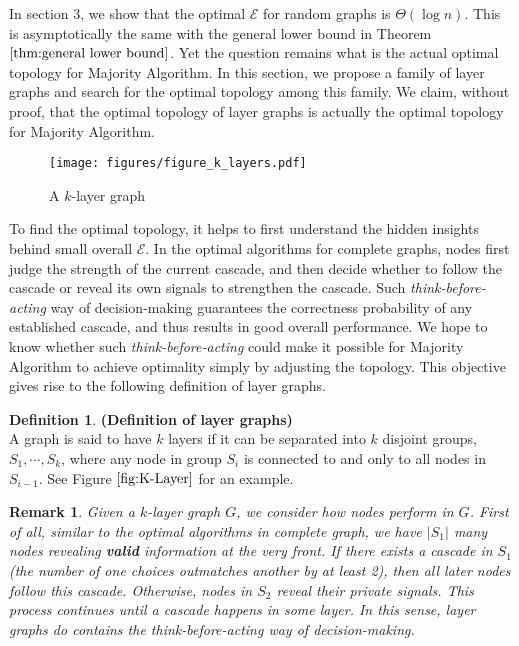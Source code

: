 \documentclass[a4paper,UKenglish]{lipics}
\newtheorem{rmk}{Remark}
\theoremstyle{definition}
\newtheorem{defn}[thm]{Definition}
\begin{document}
In section 3, we show that the optimal $\mathcal{E}$ for random graphs is $\Theta(\log n)$.
This is asymptotically the same with the general lower bound in Theorem $\ref{thm:general lower bound}$.
Yet the question remains what is the actual optimal topology for Majority Algorithm.
In this section, we propose a family of layer graphs and search for the optimal topology among this family.
We claim, without proof, that the optimal topology of layer graphs is actually the optimal topology for Majority Algorithm.

\begin{figure}
\centering
\texttt{[image: figures/figure\_k\_layers.pdf]}
\caption{A $k$-layer graph}
\label{fig:K-Layer}
\end{figure}

To find the optimal topology, it helps to first understand the hidden insights behind small overall $\mathcal{E}$.
In the optimal algorithms for complete graphs, nodes first judge the strength of the current cascade,
	and then decide whether to follow the cascade or reveal its own signals to strengthen the cascade.
Such \emph{think-before-acting} way of decision-making guarantees the correctness probability of any established cascade, and thus results in good overall performance.
We hope to know whether such \emph{think-before-acting} could make it possible for Majority Algorithm to achieve optimality simply by adjusting the topology.
This objective gives rise to the following definition of layer graphs.

\begin{defn} {\bf (Definition of layer graphs)}
\\
A graph is said to have $k$ layers if it can be separated into $k$ disjoint groups, $S_1, \dotsb, S_k$, where any node in group $S_i$ is connected to and only to all nodes in $S_{i-1}$. See Figure $\ref{fig:K-Layer}$ for an example.
\end{defn}

\begin{rmk}
\label{rmk2}
Given a $k$-layer graph $G$, we consider how nodes perform in $G$.
First of all, similar to the optimal algorithms in complete graph,
	we have $|S_1|$ many nodes revealing \textbf{valid} information at the very front.
If there exists a cascade in $S_1$ (the number of one choices outmatches another by at least 2),
	then all later nodes follow this cascade.
Otherwise, nodes in $S_2$ reveal their private signals.
This process continues until a cascade happens in some layer.
In this sense, layer graphs do contains the think-before-acting way of decision-making.
\end{rmk}
\end{document}
